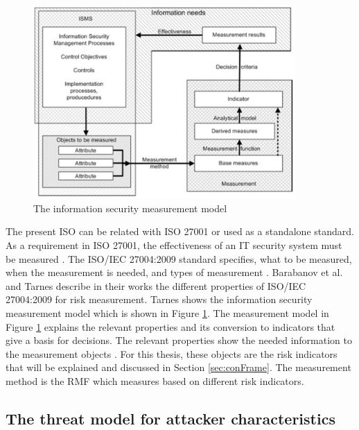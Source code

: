 \begin{figure}[ht!]
  \centering
  \includegraphics[width=10cm]{pictures/is_measurement_model.jpg}
  \caption{The information security measurement model \cite{tarnes2012information}}
  \label{fig:is_measurement_model}
\end{figure}

The present ISO can be related with ISO 27001 or used as a standalone standard. As a requirement in ISO 27001, the effectiveness of an IT security system must be measured \cite{barabanov2011information}. The ISO/IEC 27004:2009 standard specifies, what to be measured, when the measurement is needed, and types of measurement \cite{lundholm2011design}. Barabanov et al. \cite{barabanov2011information} and Tarnes \cite{tarnes2012information} describe in their works the different properties of ISO/IEC 27004:2009 for risk measurement. Tarnes shows the information security measurement model which is shown in Figure \ref{fig:is_measurement_model}.
The measurement model in Figure \ref{fig:is_measurement_model} explains the relevant properties and its conversion to indicators that give a basis for decisions. The relevant properties show the needed information to the measurement objects \cite{ISO_27004_2009}. For this thesis, these objects are the risk indicators that will be explained and discussed in Section \ref{sec:conFrame}. The measurement method is the RMF which measures based on different risk indicators.

\subsection{The threat model for attacker characteristics}
\label{sec:threat}

